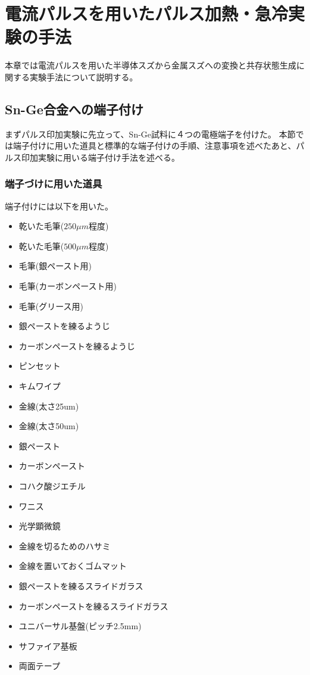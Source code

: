 \section{電流パルスを用いたパルス加熱・急冷実験の手法}
本章では電流パルスを用いた半導体スズから金属スズへの変換と共存状態生成に関する実験手法について説明する。

\subsection{Sn-Ge合金への端子付け}
まずパルス印加実験に先立って、Sn-Ge試料に４つの電極端子を付けた。
本節では端子付けに用いた道具と標準的な端子付けの手順、注意事項を述べたあと、パルス印加実験に用いる端子付け手法を述べる。

\subsubsection{端子づけに用いた道具}
端子付けには以下を用いた。
\begin{itemize}
\item 乾いた毛筆($250\mu m$程度)
\item 乾いた毛筆($500\mu m$程度)
\item 毛筆(銀ペースト用)
\item 毛筆(カーボンペースト用)
\item 毛筆(グリース用)
\item 銀ペーストを練るようじ
\item カーボンペーストを練るようじ
\item ピンセット
\item キムワイプ
\item 金線(太さ25um)
\item 金線(太さ50um)
\item 銀ペースト
\item カーボンペースト
\item コハク酸ジエチル
\item ワニス
\item 光学顕微鏡
\item 金線を切るためのハサミ
\item 金線を置いておくゴムマット
\item 銀ペーストを練るスライドガラス
\item カーボンペーストを練るスライドガラス
\item ユニバーサル基盤(ピッチ2.5mm)
\item サファイア基板
\item 両面テープ
\end{itemize}

